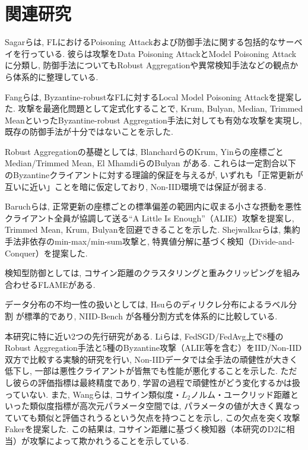 \documentclass[a4j, twocolumn, dvipdfmx]{jsarticle}
\begin{document}
\section{関連研究}
\label{sec:related}

Sagarらは, FLにおけるPoisoning Attackおよび防御手法に関する包括的なサーベイを行っている. 彼らは攻撃をData Poisoning AttackとModel Poisoning Attackに分類し, 防御手法についてもRobust Aggregationや異常検知手法などの観点から体系的に整理している\cite{sagar2023survey}.

Fangらは, Byzantine-robustなFLに対するLocal Model Poisoning Attackを提案した. 攻撃を最適化問題として定式化することで, Krum, Bulyan, Median, Trimmed MeanといったByzantine-robust Aggregation手法に対しても有効な攻撃を実現し, 既存の防御手法が十分ではないことを示した\cite{fang2020local}.

Robust Aggregationの基礎としては, BlanchardらのKrum\cite{blanchard2017krum}, Yinらの座標ごとMedian/Trimmed Mean\cite{yin2018byzantine}, El MhamdiらのBulyan\cite{elmhamdi2018hidden} がある. これらは一定割合以下のByzantineクライアントに対する理論的保証を与えるが, いずれも「正常更新が互いに近い」ことを暗に仮定しており, Non-IID環境では保証が弱まる.

Baruchらは, 正常更新の座標ごとの標準偏差の範囲内に収まる小さな摂動を悪性クライアント全員が協調して送る``A Little Is Enough''（ALIE）攻撃を提案し, Trimmed Mean, Krum, Bulyanを回避できることを示した\cite{baruch2019little}. Shejwalkarらは, 集約手法非依存のmin-max/min-sum攻撃と, 特異値分解に基づく検知（Divide-and-Conquer）を提案した\cite{shejwalkar2021manipulating}.

検知型防御としては, コサイン距離のクラスタリングと重みクリッピングを組み合わせるFLAME\cite{nguyen2022flame}がある.

データ分布の不均一性の扱いとしては, Hsuらのディリクレ分布によるラベル分割\cite{hsu2019measuring} が標準的であり, NIID-Bench\cite{li2022federated} が各種分割方式を体系的に比較している.

本研究に特に近い2つの先行研究がある. Liらは, FedSGD/FedAvg上で8種のRobust Aggregation手法と5種のByzantine攻撃（ALIE等を含む）をIID/Non-IID双方で比較する実験的研究を行い, Non-IIDデータでは全手法の頑健性が大きく低下し, 一部は悪性クライアントが皆無でも性能が悪化することを示した\cite{li2023experimental}. ただし彼らの評価指標は最終精度であり, 学習の過程で頑健性がどう変化するかは扱っていない. また, Wangらは, コサイン類似度・$L_2$ノルム・ユークリッド距離といった類似度指標が高次元パラメータ空間では, パラメータの値が大きく異なっていても類似と評価されうるという欠点を持つことを示し, この欠点を突く攻撃Fakerを提案した\cite{wang2023trust}. この結果は, コサイン距離に基づく検知器（本研究のD2に相当）が攻撃によって欺かれうることを示している.
\end{document}
